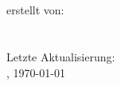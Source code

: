 \thispagestyle{plain}

\begin{titlepage}

	\begin{center}
	~\\[25ex]
	{}\\[5ex]
	
	{}\\[15ex]
	
	~\\[25ex]
	erstellt von:\\
	\personName\\
	
	~\\[10ex]
	Letzte Aktualisierung:\\
	\ort, \today
	
	\end{center}
\end{titlepage}